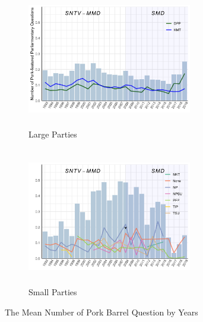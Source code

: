 \begin{figure}[!ht]
    \centering
    \begin{subfigure}[t]{0.48\textwidth}
    \centering\includegraphics[width=7.2cm, height=6cm]{03-Chapter-Three/image/bigpqmean.png}
    \caption{Large Parties}
    \label{fig:meanporkbig}
    \end{subfigure}
    \centering
    \begin{subfigure}[t]{0.48\textwidth}
    \centering\includegraphics[width=7.2cm, height=6cm]{03-Chapter-Three/image/smallpqmean.png}
    \caption{Small Parties}
    \label{fig:meanporksmall}    
    \end{subfigure}
    \caption{The Mean Number of Pork Barrel Question by Years}
    \label{fig:meanpork}    
\end{figure}
